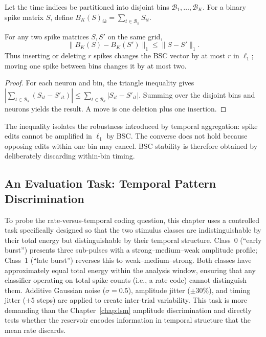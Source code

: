 Let the time indices be partitioned into disjoint bins
$\mathcal{B}_1,\ldots,\mathcal{B}_K$. For a binary spike matrix $S$, define
$B_K(S)_{ik}=\sum_{t\in\mathcal{B}_k}S_{it}$.

\begin{proposition}
\label{prop:bsc_stability}
For any two spike matrices $S,S'$ on the same grid,
\begin{equation}
\|B_K(S)-B_K(S')\|_1\le \|S-S'\|_1.
\end{equation}
Thus inserting or deleting $r$ spikes changes the BSC vector by at most $r$ in
$\ell_1$; moving one spike between bins changes it by at most two.
\end{proposition}

\begin{proof}
For each neuron and bin, the triangle inequality gives
$|\sum_{t\in\mathcal{B}_k}(S_{it}-S'_{it})|
\le\sum_{t\in\mathcal{B}_k}|S_{it}-S'_{it}|$. Summing over the disjoint bins
and neurons yields the result. A move is one deletion plus one insertion.
\end{proof}

The inequality isolates the robustness introduced by temporal aggregation: spike
edits cannot be amplified in $\ell_1$ by BSC. The converse does not hold because
opposing edits within one bin may cancel. BSC stability is therefore obtained by
deliberately discarding within-bin timing.

\subsection{An Evaluation Task: Temporal Pattern Discrimination}

To probe the rate-versus-temporal coding question, this chapter uses a controlled task specifically designed so that the two stimulus classes are indistinguishable by their total energy but distinguishable by their temporal structure. Class~0 (``early burst'') presents three sub-pulses with a strong--medium--weak amplitude profile; Class~1 (``late burst'') reverses this to weak--medium--strong. Both classes have approximately equal total energy within the analysis window, ensuring that any classifier operating on total spike counts (i.e., a rate code) cannot distinguish them. Additive Gaussian noise ($\sigma = 0.5$), amplitude jitter ($\pm 30\%$), and timing jitter ($\pm 5$ steps) are applied to create inter-trial variability. This task is more demanding than the Chapter~\ref{chap:lsm} amplitude discrimination and directly tests whether the reservoir encodes information in temporal structure that the mean rate discards.


